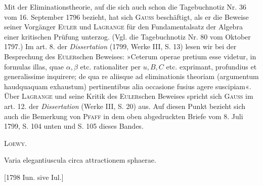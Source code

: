 \medskip\begingroup\small
\indent Mit der Eliminationstheorie, auf die sich auch schon die Tagebuchnotiz Nr. 36 vom 16. September 1796 bezieht, hat sich \textsc{Gauss} beschäftigt, als er die Beweise seiner Vorgänger \textsc{Euler} und \textsc{Lagrange} für den Fundamentalsatz der Algebra einer kritischen Prüfung unterzog. (Vgl. die Tagebuchnotiz Nr. 80 vom Oktober 1797.) Im art. 8. der \textit{Dissertation} (1799, Werke III, S. 13) lesen wir bei der Besprechung des \textsc{Euler}schen Beweises: »Ceterum operae pretium esse videtur, in formulas illas, quae \(\alpha,\beta\) etc. rationaliter per \(u,B,C\) etc. exprimant, profundius et generalissime inquirere; de qua re aliisque ad eliminationis theoriam (argumentum haudquaquam exhaustum) pertinentibus alia occasione fusius agere suscipiam«. Über \textsc{Lagrange} und seine Kritik des \textsc{Euler}schen Beweises spricht sich \textsc{Gauss} im art. 12. der \textit{Dissertation} (Werke III, S. 20) aus. Auf diesen Punkt bezieht sich auch die Bemerkung von \textsc{Pfaff} in dem oben abgedruckten Briefe vom 8. Juli 1799, S. 104 unten und S. 105 dieses Bandes.
\par\noindent\hfill\textsc{Loewy.}
\par\endgroup

\indent Varia elegantiuscula circa attractionem sphaerae.
\par\noindent\hfill[1798 Iun. sive Iul.]
